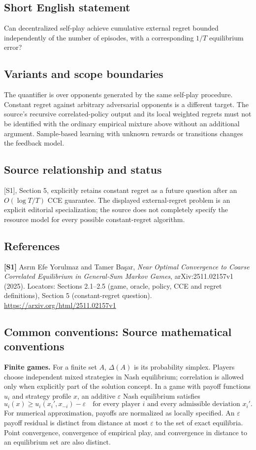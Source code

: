 \documentclass[11pt,a4paper]{article}
\begin{document}
\subsection*{Short English statement}
Can decentralized self-play achieve cumulative external regret bounded independently of the number of episodes, with a corresponding $1/T$ equilibrium error?
\subsection*{Variants and scope boundaries}
The quantifier is over opponents generated by the same self-play procedure. Constant regret against arbitrary adversarial opponents is a different target. The source's recursive correlated-policy output and its local weighted regrets must not be identified with the ordinary empirical mixture above without an additional argument. Sample-based learning with unknown rewards or transitions changes the feedback model.
\subsection*{Source relationship and status}
[S1], Section 5, explicitly retains constant regret as a future question after an $O(\log T/T)$ CCE guarantee. The displayed external-regret problem is an explicit editorial specialization; the source does not completely specify the resource model for every possible constant-regret algorithm.
\subsection*{References}
\begingroup\footnotesize\raggedright
\textbf{[S1]} Asr\i n Efe Yorulmaz and Tamer Ba\c{s}ar, \emph{Near Optimal Convergence to Coarse Correlated Equilibrium in General-Sum Markov Games}, arXiv:2511.02157v1 (2025). Locators: Sections 2.1--2.5 (game, oracle, policy, CCE and regret definitions), Section 5 (constant-regret question). \url{https://arxiv.org/html/2511.02157v1}
\par\endgroup

\subsection*{Common conventions: Source mathematical conventions}

\textbf{Finite games.} For a finite set $A$, $\Delta(A)$ is its probability
simplex. Players choose independent mixed strategies in Nash equilibrium;
correlation is allowed only when explicitly part of the solution concept.
In a game with payoff functions $u_i$ and strategy profile $x$, an additive
$\varepsilon$ Nash equilibrium satisfies
\[
 u_i(x)\geq u_i(x_i',x_{-i})-\varepsilon
 \quad\text{for every player $i$ and every admissible deviation $x_i'$}.
\]
For numerical approximation, payoffs are normalized as locally specified.
An $\varepsilon$ payoff residual is distinct from distance at most
$\varepsilon$ to the set of exact equilibria. Point convergence, convergence
of empirical play, and convergence in distance to an equilibrium set are
also distinct.
\end{document}
